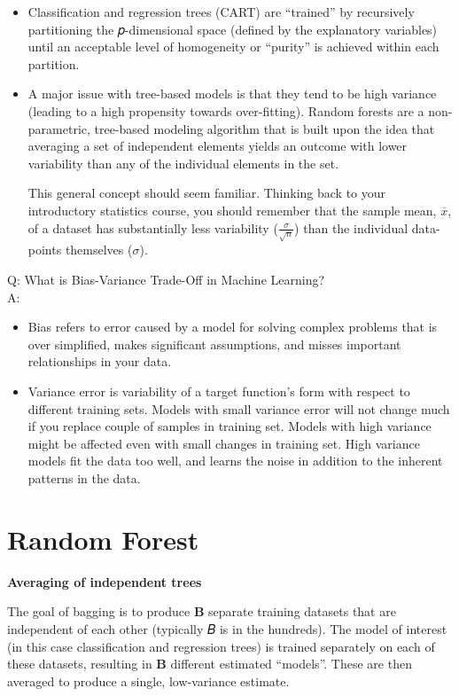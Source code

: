 \documentclass[
  a4paper,
  twoside,
  openright]{book}
\providecommand{\tightlist}{%
  \setlength{\itemsep}{0pt}\setlength{\parskip}{0pt}}
\theoremstyle{definition}
\theoremstyle{definition}
\theoremstyle{definition}
\theoremstyle{definition}
\theoremstyle{remark}
\begin{document}
\begin{itemize}
\item
  Classification and regression trees (CART) are ``trained'' by recursively partitioning the 𝑝-dimensional space (defined by the explanatory variables) until an acceptable level of homogeneity or ``purity'' is achieved within each partition.
\item
  A major issue with tree-based models is that they tend to be high variance (leading to a high propensity towards over-fitting). Random forests are a non-parametric, tree-based modeling algorithm that is built upon the idea that averaging a set of independent elements yields an outcome with lower variability than any of the individual elements in the set.

  This general concept should seem familiar. Thinking back to your introductory statistics course, you should remember that the sample mean, \(\overline{x}\), of a dataset has substantially less variability (\(\frac{\sigma}{\sqrt{n}}\)) than the individual data-points themselves (\(\sigma\)).
\end{itemize}

Q: What is Bias-Variance Trade-Off in Machine Learning?\\
A:

\begin{itemize}
\tightlist
\item
  Bias refers to error caused by a model for solving complex problems that is over simplified, makes significant assumptions, and misses important relationships in your data.
\item
  Variance error is variability of a target function's form with respect to different training sets. Models with small variance error will not change much if you replace couple of samples in training set. Models with high variance might be affected even with small changes in training set. High variance models fit the data too well, and learns the noise in addition to the inherent patterns in the data.
\end{itemize}

\section{Random Forest}\label{random-forest}

\textbf{Averaging of independent trees}

The goal of bagging is to produce \(\boldsymbol{B}\) separate training datasets that are independent of each other (typically 𝐵 is in the hundreds). The model of interest (in this case classification and regression trees) is trained separately on each of these datasets, resulting in \(\boldsymbol{B}\) different estimated ``models''. These are then averaged to produce a single, low-variance estimate.
\end{document}
